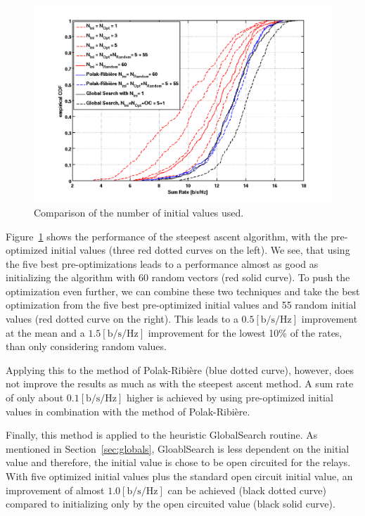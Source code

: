 \begin{figure}[hb]
\centering
  \includegraphics[width=0.7\linewidth]{images/Inioptcomparison_edited.png}
\caption{Comparison of the number of initial values used.}
\label{fig:iniopt_comp}
\end{figure}

Figure~\ref{fig:iniopt_comp} shows the performance of the steepest ascent algorithm, with the pre-optimized initial values (three red dotted curves on the left).
We see, that using the five best pre-optimizations leads to a performance almost as good as initializing the algorithm with 60 random vectors (red solid curve).
To push the optimization even further, we can combine these two techniques and take the best optimization from the five best pre-optimized initial values and 55 random initial values (red dotted curve on the right).
This leads to a $0.5 \left[\text{b/s/Hz}\right]$ improvement at the mean and a $1.5 \left[\text{b/s/Hz}\right]$ improvement for the lowest 10\% of the rates, than only considering random values.

Applying this to the method of Polak-Ribi\`{e}re (blue dotted curve), however, does not improve the results as much as with the steepest ascent method.
A sum rate of only about $0.1 \left[\text{b/s/Hz}\right]$ higher is achieved by using pre-optimized initial values in combination with the method of Polak-Ribi\`{e}re.

Finally, this method is applied to the heuristic GlobalSearch routine.
As mentioned in Section~\ref{sec:globals}, GloablSearch is less dependent on the initial value and therefore, the initial value is chose to be open circuited for the relays.
With five optimized initial values plus the standard open circuit initial value, an improvement of almost $1.0 \left[\text{b/s/Hz}\right]$ can be achieved (black dotted curve) compared to initializing only by the open circuited value (black solid curve).



